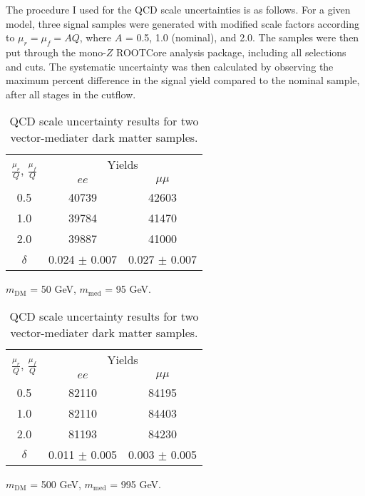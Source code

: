 The procedure I used for the QCD scale uncertainties is as follows. For a given model, three signal samples were generated with modified scale factors according to $\mu_r = \mu_f = AQ$, where $A$ = 0.5, 1.0 (nominal), and 2.0. The samples were then put through the mono-$Z$ ROOTCore analysis package, including all selections and cuts. The systematic uncertainty was then calculated by observing the maximum percent difference in the signal yield compared to the nominal sample, after all stages in the cutflow. 

\begin{table}[!htb]
    \begin{subtable}{.5\linewidth}
      \centering
\begin{tabular}{|c||c|c|}
\hline
\multirow{2}{*}{$\frac{\mu_r}{Q}$, $\frac{\mu_f}{Q}$} & \multicolumn{2}{c|}{Yields}     \\ \cline{2-3} 
                              & $ee$           & $\mu\mu$       \\ \hline \hline
0.5                           & 40739          & 42603          \\ \hline
1.0                           & 39784          & 41470          \\ \hline
2.0                           & 39887          & 41000          \\ \hline \hline
$\delta$                      & 0.024 $\pm$ 0.007 & 0.027 $\pm$ 0.007 \\ \hline
\end{tabular}
\caption{$m_{\text{DM}}$ = 50 GeV, $m_{\text{med}}$ = 95 GeV.}
    \end{subtable}%
    \begin{subtable}{.5\linewidth}
      \centering
\begin{tabular}{|c||c|c|}
\hline
\multirow{2}{*}{$\frac{\mu_r}{Q}$, $\frac{\mu_f}{Q}$} & \multicolumn{2}{c|}{Yields}     \\ \cline{2-3} 
                              & $ee$           & $\mu\mu$       \\ \hline \hline
0.5                           & 82110          & 84195          \\ \hline
1.0                           & 82110          & 84403          \\ \hline
2.0                           & 81193          & 84230          \\ \hline \hline
$\delta$                      & 0.011 $\pm$ 0.005 & 0.003 $\pm$ 0.005 \\ \hline
\end{tabular}
\caption{$m_{\text{DM}}$ = 500 GeV, $m_{\text{med}}$ = 995 GeV.}
    \end{subtable} 
    \caption{QCD scale uncertainty results for two vector-mediater dark matter samples.}
\label{tbl:qcdresults}
\end{table}

